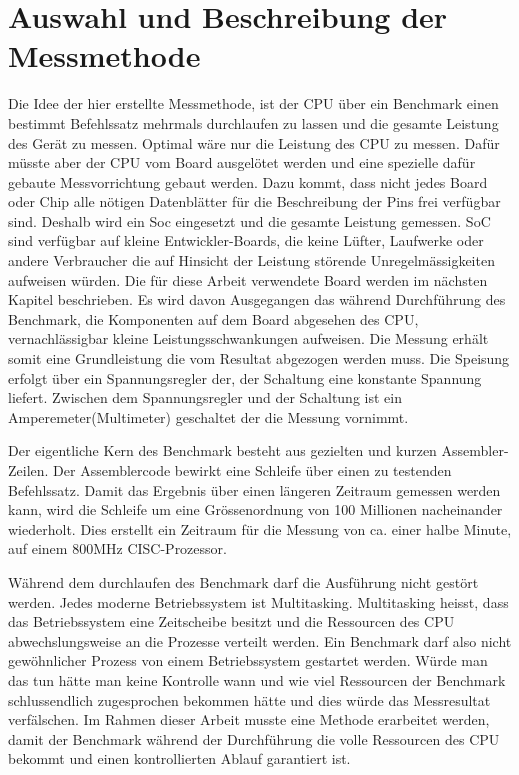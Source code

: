 \section{Auswahl und Beschreibung der Messmethode}
\label{chap:auswahl_beschreibung_methode}

Die Idee der hier erstellte Messmethode, ist der CPU über ein Benchmark einen bestimmt Befehlssatz mehrmals durchlaufen zu lassen und die gesamte Leistung des Gerät zu messen. Optimal wäre nur die Leistung des CPU zu messen. Dafür müsste aber der CPU vom Board ausgelötet werden und eine spezielle dafür gebaute Messvorrichtung gebaut werden. Dazu kommt, dass nicht jedes Board oder Chip alle nötigen Datenblätter für die Beschreibung der Pins frei verfügbar sind. Deshalb wird ein Soc eingesetzt und die gesamte Leistung gemessen. SoC sind verfügbar auf kleine Entwickler-Boards, die keine Lüfter, Laufwerke oder andere Verbraucher die  auf Hinsicht der Leistung störende Unregelmässigkeiten aufweisen würden. Die für diese Arbeit verwendete Board werden im nächsten Kapitel beschrieben. Es wird davon Ausgegangen das während Durchführung des Benchmark, die Komponenten auf dem Board abgesehen des CPU, vernachlässigbar kleine Leistungsschwankungen aufweisen. Die Messung erhält somit eine Grundleistung die vom Resultat abgezogen werden muss. Die Speisung erfolgt über ein Spannungsregler der, der Schaltung eine konstante Spannung liefert. Zwischen dem Spannungsregler und der Schaltung ist ein Amperemeter(Multimeter) geschaltet der die Messung vornimmt.
\par
Der eigentliche Kern des Benchmark besteht aus gezielten und kurzen Assembler-Zeilen. Der Assemblercode bewirkt eine Schleife über einen zu testenden Befehlssatz. Damit das Ergebnis über einen längeren Zeitraum gemessen werden kann, wird die Schleife um eine Grössenordnung von 100 Millionen nacheinander wiederholt. Dies erstellt ein Zeitraum für die Messung von ca. einer halbe Minute, auf einem 800MHz CISC-Prozessor.
\par
Während dem durchlaufen des Benchmark darf die Ausführung nicht gestört werden. Jedes moderne Betriebssystem ist Multitasking. Multitasking heisst, dass das Betriebssystem eine Zeitscheibe besitzt und die Ressourcen des CPU abwechslungsweise an die Prozesse verteilt werden. Ein Benchmark darf also nicht gewöhnlicher Prozess von einem Betriebssystem gestartet werden. Würde man das tun hätte man keine Kontrolle wann und wie viel Ressourcen der Benchmark schlussendlich zugesprochen bekommen hätte und dies würde das Messresultat verfälschen. Im Rahmen dieser Arbeit musste eine Methode erarbeitet werden, damit der Benchmark während der Durchführung die volle Ressourcen des CPU bekommt und einen kontrollierten Ablauf garantiert ist.
